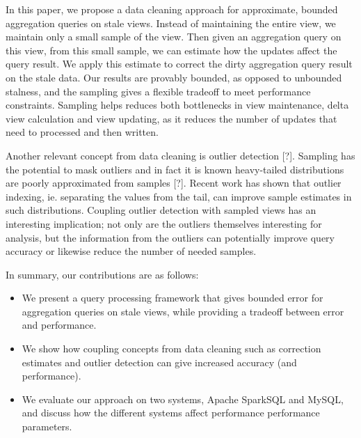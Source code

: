 In this paper, we propose a data cleaning approach for approximate,
bounded aggregation queries on stale views. Instead of maintaining
the entire view, we maintain only a small sample of the view. Then
given an aggregation query on this view, from this small sample, we
can estimate how the updates affect the query result. We apply this
estimate to correct the dirty aggregation query result on the stale
data. Our results are provably bounded, as opposed to unbounded stalness,
and the sampling gives a flexible tradeoff to meet performance constraints.
Sampling helps reduces both bottlenecks in view maintenance, delta
view calculation and view updating, as it reduces the number of updates
that need to processed and then written.

Another relevant concept from data cleaning is outlier detection {[}?{]}.
Sampling has the potential to mask outliers and in fact it is known
heavy-tailed distributions are poorly approximated from samples {[}?{]}.
Recent work has shown that outlier indexing, ie. separating the values
from the tail, can improve sample estimates in such distributions.
Coupling outlier detection with sampled views has an interesting implication;
not only are the outliers themselves interesting for analysis, but
the information from the outliers can potentially improve query accuracy
or likewise reduce the number of needed samples.

In summary, our contributions are as follows:
\begin{itemize}
\item We present a query processing framework that gives bounded error for
aggregation queries on stale views, while providing a tradeoff between
error and performance.
\item We show how coupling concepts from data cleaning such as correction
estimates and outlier detection can give increased accuracy (and performance).
\item We evaluate our approach on two systems, Apache SparkSQL and MySQL,
and discuss how the different systems affect performance performance
parameters.
\end{itemize}